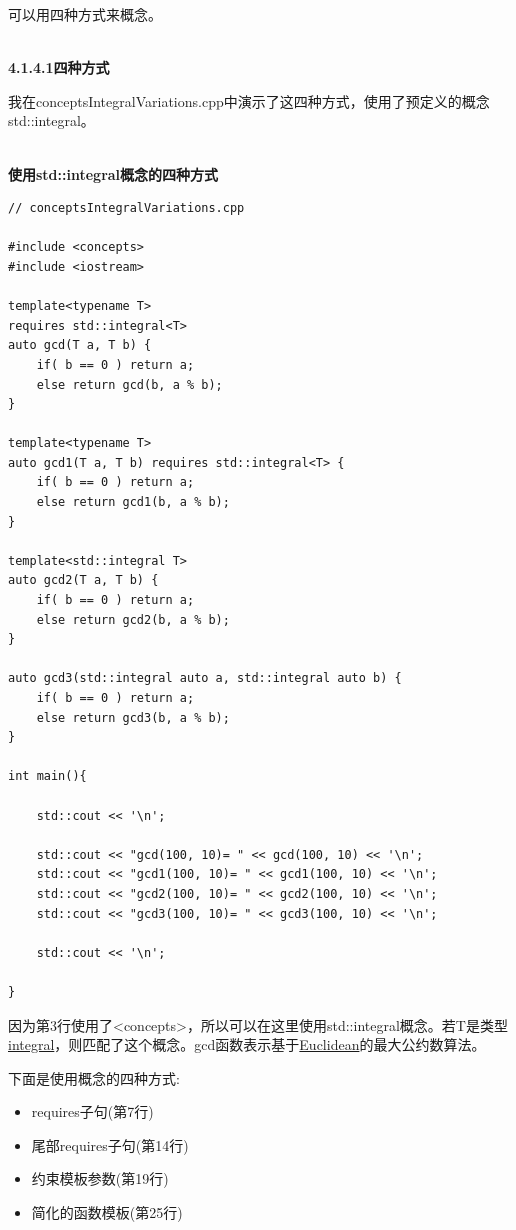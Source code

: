 
可以用四种方式来概念。

\hspace*{\fill} \\ %
\noindent
\textbf{4.1.4.1\hspace{0.2cm}四种方式}

我在conceptsIntegralVariations.cpp中演示了这四种方式，使用了预定义的概念std::integral。

\hspace*{\fill} \\ %
\noindent
\textbf{使用std::integral概念的四种方式}
\begin{lstlisting}[style=styleCXX]
// conceptsIntegralVariations.cpp

#include <concepts>
#include <iostream>

template<typename T>
requires std::integral<T>
auto gcd(T a, T b) {
	if( b == 0 ) return a;
	else return gcd(b, a % b);
}

template<typename T>
auto gcd1(T a, T b) requires std::integral<T> {
	if( b == 0 ) return a;
	else return gcd1(b, a % b);
}

template<std::integral T>
auto gcd2(T a, T b) {
	if( b == 0 ) return a;
	else return gcd2(b, a % b);
}

auto gcd3(std::integral auto a, std::integral auto b) {
	if( b == 0 ) return a;
	else return gcd3(b, a % b);
}

int main(){

	std::cout << '\n';

	std::cout << "gcd(100, 10)= " << gcd(100, 10) << '\n';
	std::cout << "gcd1(100, 10)= " << gcd1(100, 10) << '\n';
	std::cout << "gcd2(100, 10)= " << gcd2(100, 10) << '\n';
	std::cout << "gcd3(100, 10)= " << gcd3(100, 10) << '\n';

	std::cout << '\n';

}
\end{lstlisting}

因为第3行使用了<concepts>，所以可以在这里使用std::integral概念。若T是类型\href{https://en.cppreference.com/w/cpp/types/is_integral}{integral}，则匹配了这个概念。gcd函数表示基于\href{https://en.wikipedia.org/wiki/Euclid}{Euclidean}的最大公约数算法。

下面是使用概念的四种方式:

\begin{itemize}
\item
requires子句(第7行)

\item
尾部requires子句(第14行)

\item
约束模板参数(第19行)

\item
简化的函数模板(第25行)
\end{itemize}

